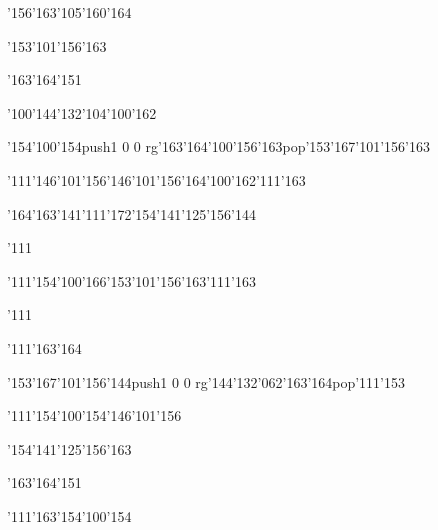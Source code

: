 \null\vfill\ipa\centerline{\enskip\enskip\enskip\enskip\enskip\enskip\enskip\enskip\char'156\char'163\char'105\char'160\char'164}\medskip\centerline{\enskip\enskip\enskip\enskip\enskip\enskip\enskip\char'153\char'101\char'156\char'163\enskip\enskip\enskip}\medskip\centerline{\enskip\enskip\enskip\char'163\char'164\char'151\enskip\enskip\enskip\enskip\enskip\enskip}\medskip\centerline{\enskip\enskip\enskip\enskip\char'100\char'144\char'132\enskip\enskip\enskip\enskip\char'104\char'100\char'162}\medskip\centerline{\enskip\char'154\char'100\char'154\enskip\pdfcolorstack\match push{1 0 0 rg}\char'163\char'164\char'100\char'156\char'163\pdfcolorstack\match pop{}\enskip\char'153\char'167\char'101\char'156\char'163\enskip\enskip\enskip}\medskip\centerline{\enskip\char'111\enskip\char'146\char'101\char'156\enskip\char'146\char'101\char'156\enskip\char'164\char'100\char'162\enskip\char'111\char'163}\medskip\centerline{\enskip\char'164\char'163\char'141\char'111\char'172\enskip\enskip\enskip\enskip\char'154\char'141\char'125\char'156\char'144\enskip\enskip\enskip}\medskip\centerline{\enskip\char'111\enskip\enskip\enskip\enskip\enskip\enskip\enskip\enskip\enskip\enskip}\medskip\centerline{\enskip\enskip\enskip\enskip\enskip\enskip\enskip\enskip\enskip\enskip\enskip\enskip\enskip\enskip\enskip}\medskip\vfill\footline{\hfil\tt\folio\hfil}\eject
\null\vfill\ipa\centerline{\enskip\enskip\enskip\enskip\enskip\enskip\enskip\enskip\enskip\enskip\enskip\enskip\enskip}\medskip\centerline{\enskip\char'111\enskip\char'154\char'100\char'166\enskip\char'153\char'101\char'156\char'163\enskip\char'111\char'163}\medskip\centerline{\enskip\char'111\enskip\enskip\enskip\enskip\enskip\enskip\enskip\enskip\enskip\enskip}\medskip\centerline{\enskip\enskip\enskip\enskip\char'111\char'163\char'164\enskip\enskip\enskip\enskip\enskip\enskip\enskip}\medskip\centerline{\enskip\enskip\enskip\enskip\enskip\char'153\char'167\char'101\char'156\char'144\enskip\pdfcolorstack\match push{1 0 0 rg}\char'144\char'132\char'062\char'163\char'164\pdfcolorstack\match pop{}\enskip\char'111\char'153}\medskip\centerline{\enskip\char'111\enskip\char'154\char'100\char'154\enskip\char'146\char'101\char'156\enskip\enskip\enskip\enskip\enskip\enskip\enskip}\medskip\centerline{\enskip\enskip\enskip\enskip\enskip\enskip\enskip\enskip\enskip\enskip\char'154\char'141\char'125\char'156\char'163\enskip\enskip\enskip}\medskip\centerline{\enskip\enskip\enskip\char'163\char'164\char'151\enskip\enskip\enskip\enskip\enskip\enskip}\medskip\centerline{\enskip\char'111\char'163\enskip\enskip\enskip\enskip\char'154\char'100\char'154\enskip\enskip\enskip\enskip\enskip}\medskip\vfill\footline{\hfil\tt\folio\hfil}\eject
